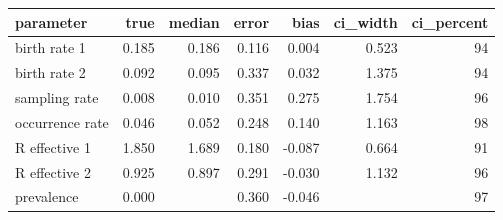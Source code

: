 \begin{table}[ht]
\centering
\begin{tabular}{lrrrrrr}
  \hline
parameter & true & median & error & bias & ci\_width & ci\_percent \\ 
  \hline
birth rate 1 & 0.185 & 0.186 & 0.116 & 0.004 & 0.523 & 94 \\ 
  birth rate 2 & 0.092 & 0.095 & 0.337 & 0.032 & 1.375 & 94 \\ 
  sampling rate & 0.008 & 0.010 & 0.351 & 0.275 & 1.754 & 96 \\ 
  occurrence rate & 0.046 & 0.052 & 0.248 & 0.140 & 1.163 & 98 \\ 
  R effective 1 & 1.850 & 1.689 & 0.180 & -0.087 & 0.664 & 91 \\ 
  R effective 2 & 0.925 & 0.897 & 0.291 & -0.030 & 1.132 & 96 \\ 
  prevalence & 0.000 &  & 0.360 & -0.046 &  & 97 \\ 
   \hline
\end{tabular}
\end{table}
